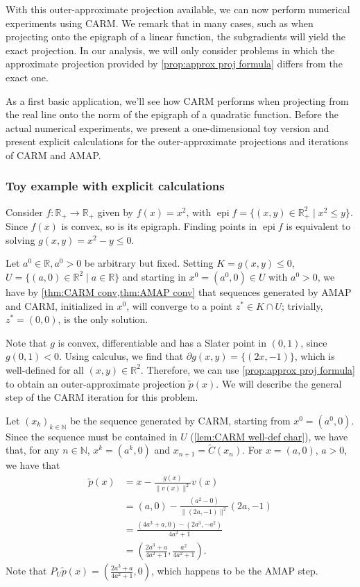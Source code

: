 \documentclass[smallextended,numbook,nospthms]{svjour3}
\theoremstyle{plain}
\theoremstyle{definition}
\def\RR{\mathds R}
\def\NN{\mathds N}
\DeclareMathOperator{\epi}{epi}
\begin{document}
With this outer-approximate projection available, we can now perform numerical experiments using CARM. We remark that in many cases, such as when projecting onto the epigraph of a linear function, the subgradients will yield the exact projection. In our analysis, we will only consider problems in which the approximate projection provided by \cref{prop:approx proj formula} differs from the exact one.

As a first basic application, we'll see how CARM performs when projecting from the real line onto the norm of the epigraph of a quadratic function. Before the actual numerical experiments, we present a one-dimensional toy version and present explicit calculations for the outer-approximate projections and iterations of CARM and AMAP.

\subsubsection{Toy example with explicit calculations}
Consider $f:\RR_{+} \rightarrow \RR_{+}$ given by $f(x)=x^2$, with $\epi f = \{(x,y) \in \RR^{2}_{+} \mid x^2 \leq y\}$. Since $f(x)$ is convex, so is its epigraph. Finding points in $\epi f$ is equivalent to solving $g(x,y)=x^2-y \leq 0$.

Let $a^0 \in \RR, a^0>0$ be arbitrary but fixed. Setting $K = g(x,y) \leq 0$, $U = \{(a,0) \in \RR^{2} \mid a \in \RR \}$ and starting in $x^0=(a^0,0) \in U$ with $a^0>0$, we have by \cref{thm:CARM conv,thm:AMAP conv} that sequences generated by AMAP and CARM, initialized in $x^0$, will converge to a point $z^* \in K \cap U$; trivially, $z^*=(0,0)$, is the only solution.

Note that $g$ is convex, differentiable and has a Slater point in $(0,1)$, since $g(0,1)<0$. Using calculus, we find that $\partial g(x,y)=\{(2x,-1)\}$, which is well-defined for all $(x,y) \in \RR^{2}$. Therefore, we can use \cref{prop:approx proj formula} to obtain an outer-approximate projection $\tilde{p}(x)$. We will describe the general step of the CARM iteration for this problem.

Let $(x_k)_{k \in \NN}$ be the sequence generated by CARM, starting from $x^0=(a^0,0)$. Since the sequence must be contained in $U$ (\cref{lem:CARM well-def char}), we have that, for any $n \in \NN$, $x^k=(a^k,0)$ and $x_{n+1}=\tilde{C}(x_{n})$.
For $x=(a,0)$, $a>0$, we have that
\begin{align}
\tilde{p}(x)&=x-\frac{g(x)}{\|v(x)\|^{2}} v(x) \\
			&=(a,0) - \frac{(a^2-0)}{\|(2a,-1)\|^2}(2a,-1) \\
			&=\frac{(4a^3+a,0) - (2a^3,-a^2)}{4a^2+1} \\
			&=\left(\frac{2a^3+a}{4a^2+1},\frac{a^2}{4a^2+1}\right).
\end{align}
Note that $P_{U}\tilde{p}(x)=\left(\frac{2a^3+a}{4a^2+1},0\right)$, which happens to be the AMAP step.
\end{document}
